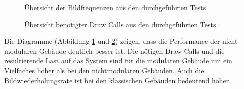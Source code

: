 \begin{figure}[H]
\centering
  \caption{Übersicht der Bildfrequenzen aus den durchgeführten Tests.}
	\label{PerformancteTestFPS}
\end{figure}
\begin{figure}[H]
\centering
  \caption{Übersicht benötigter Draw Calls  aus den durchgeführten Tests.}
	\label{PerformancteTestDC}
\end{figure}
\newpage
Die Diagramme (Abbildung \ref{PerformancteTestFPS} und \ref{PerformancteTestDC}) zeigen, dass die Performance der nicht-modularen Gebäude deutlich besser ist. Die nötigen Draw Calls und die resultierende Last auf das System sind für die modularen Gebäude um ein Vielfaches höher als bei den nichtmodularen Gebäuden. Auch die Bildwiederholungsrate ist bei den klassischen Gebäuden bedeutend höher.
